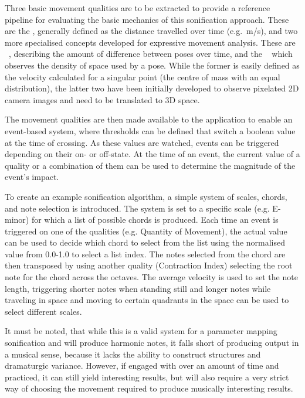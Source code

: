 Three basic movement qualities are to be extracted to provide a reference pipeline for evaluating the basic mechanics of this sonification approach.
These are the , generally defined as the distance travelled over time (e.g.\ m/s), and two more specialised concepts developed for expressive movement analysis.
These are ~\parencite[96-97]{movementQualities}, describing the amount of difference between poses over time, and the ~\parencite[97]{movementQualities} which observes the density of space used by a pose.
While the former is easily defined as the velocity calculated for a singular point (the centre of mass with an equal distribution), the latter two have been initially developed to observe pixelated \ac{2D} camera images and need to be translated to \ac{3D} space.

The movement qualities are then made available to the application to enable an event-based system, where thresholds can be defined that switch a boolean value at the time of crossing.
As these values are watched, events can be triggered depending on their on- or off-state.
At the time of an event, the current value of a quality or a combination of them can be used to determine the magnitude of the event's impact.

To create an example sonification algorithm, a simple system of scales, chords, and note selection is introduced.
The system is set to a specific scale (e.g. E-minor) for which a list of possible chords is produced. Each time an event is triggered on one of the qualities (e.g. Quantity of Movement), the actual value can be used to decide which chord to select from the list using the normalised value from 0.0-1.0 to select a list index. The notes selected from the chord are then transposed by using another quality (Contraction Index) selecting the root note for the chord across the octaves.
The average velocity is used to set the note length, triggering shorter notes when standing still and longer notes while traveling in space and moving to certain quadrants in the space can be used to select different scales.

It must be noted, that while this is a valid system for a parameter mapping sonification and will produce harmonic notes, it falls short of producing output in a musical sense, because it lacks the ability to construct structures and dramaturgic variance.
However, if engaged with over an amount of time and practiced, it can still yield interesting results, but will also require a very strict way of choosing the movement required to produce musically interesting results.

